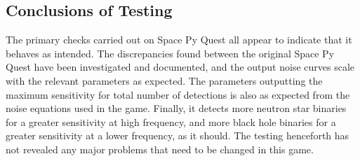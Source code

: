 \documentclass{article}
\begin{document}
\subsection{Conclusions of Testing}
 The primary checks carried out on Space Py Quest all appear to
 indicate that it behaves as intended. The discrepancies found between
 the original Space Py Quest have been investigated and documented,
 and the output noise curves scale with the relevant parameters as
 expected. The parameters outputting the maximum sensitivity for total
 number of detections is also as expected from the noise equations
 used in the game. Finally, it detects more neutron star binaries for
 a greater sensitivity at high frequency, and more black hole binaries
 for a greater sensitivity at a lower frequency, as it should. The
 testing henceforth has not revealed any major problems that need to
 be changed in this game. 
 
\end{document}
